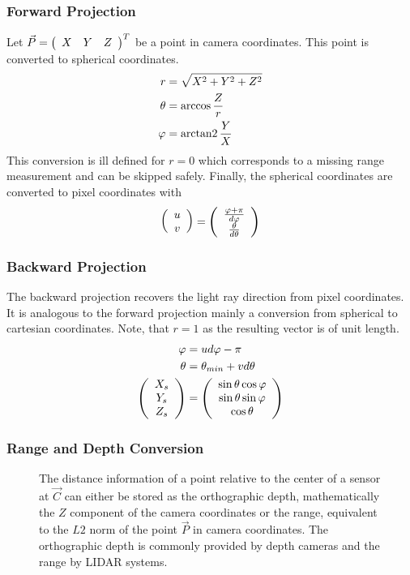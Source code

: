 \subsubsection*{Forward Projection}

Let $\vec{P} = \left(\begin{array}{ccc} X & Y & Z \end{array}\right)^T$ be a point in camera coordinates.
This point is converted to spherical coordinates.
\begin{equation}
\begin{aligned}
    r       &= \sqrt{X^2 + Y^2 + Z^2} \\
    \theta  &= \arccos{\frac{Z}{r}} \\
    \varphi &= \operatorname{arctan2}{\frac{Y}{X}}
\end{aligned}
\end{equation}
This conversion is ill defined for $r = 0$ which corresponds to a missing range measurement and can be skipped safely.
Finally, the spherical coordinates are converted to pixel coordinates with
\begin{equation}
\begin{aligned} 
    \left(\begin{array}{c} u \\ v \end{array}\right) = \left(\begin{array}{c} \frac{\varphi + \pi}{d\varphi} \\ \frac{\theta}{d\theta} \end{array}\right)
\end{aligned}
\end{equation}

\subsubsection*{Backward Projection}

The backward projection recovers the light ray direction from pixel coordinates.
It is analogous to the forward projection mainly a conversion from spherical to cartesian coordinates.
Note, that $r = 1$ as the resulting vector is of unit length.
\begin{equation}
\begin{aligned}
    \varphi &= u d\varphi - \pi \\
    \theta &= \theta_{min} + v d\theta \\
    \left(\begin{array}{c} X_s \\ Y_s \\ Z_s \end{array}\right) &= \left(\begin{array}{c} \sin \theta \cos \varphi \\ \sin \theta \sin \varphi \\ \cos \theta \end{array}\right)
\end{aligned}
\end{equation}

\subsubsection{Range and Depth Conversion}

\begin{figure}[H]
    
    \caption[Orthographic Depth and Range visualized]{The distance information of a point relative to the center of a sensor at $\vec{C}$ can either be stored as the orthographic depth, mathematically the $Z$ component of the camera coordinates or the range, equivalent to the $L2$ norm of the point $\vec{P}$ in camera coordinates. The orthographic depth is commonly provided by depth cameras and the range by \acrshort{LIDAR} systems.}
    \label{fig:range_depth}
\end{figure}

